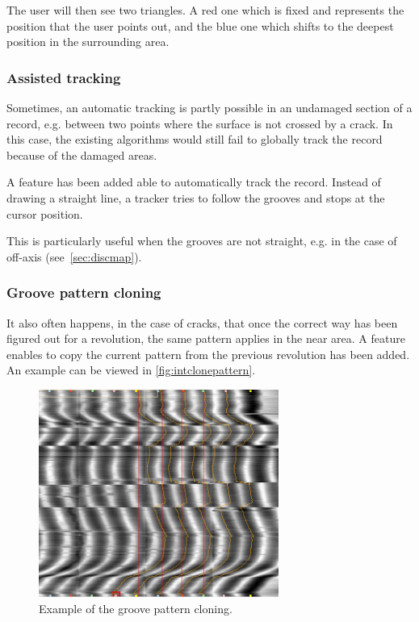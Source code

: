 The user will then see two triangles. A red one which is fixed and represents the position that the user points out, and the blue one which shifts to the deepest position in the surrounding area.

\subsubsection{Assisted tracking}

Sometimes, an automatic tracking is partly possible in an undamaged section of a record, e.g. between two points where the surface is not crossed by a crack. In this case, the existing algorithms would still fail to globally track the record because of the damaged areas.

A feature has been added able to automatically track the record. Instead of drawing a straight line, a tracker tries to follow the grooves and stops at the cursor position.

This is particularly useful when the grooves are not straight, e.g. in the case of off-axis (see~\autoref{sec:discmap}).

\subsubsection{Groove pattern cloning}

It also often happens, in the case of cracks, that once the correct way has been figured out for a revolution, the same pattern applies in the near area. A feature enables to copy the current pattern from the previous revolution has been added. An example can be viewed in \autoref{fig:intclonepattern}.

\begin{figure}[!ht]
\centering
\includegraphics[width=0.7\textwidth]{images/int-track-clone}
\caption{Example of the groove pattern cloning.}
\label{fig:intclonepattern}
\end{figure}

